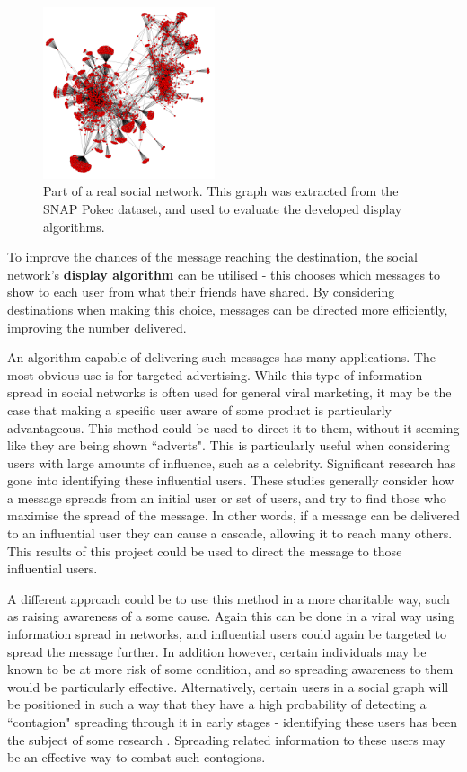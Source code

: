\documentclass[bsc,frontabs,twoside,singlespacing,parskip,deptreport]{infthesis}     %
\begin{document}
\begin{figure}
\centering
\includegraphics[width=0.45\textwidth]{pokec_4000}
\caption{Part of a real social network. This graph was extracted from the SNAP Pokec dataset\cite{snapnets}, and used to evaluate the developed display algorithms.}
\label{fig:pokec_4000_intro}
\end{figure}

To improve the chances of the message reaching the destination, the social network's \textbf{display algorithm} can be utilised - this chooses which messages to show to each user from what their friends have shared. By considering destinations when making this choice, messages can be directed more efficiently, improving the number delivered.

An algorithm capable of delivering such messages has many applications. The most obvious use is for targeted advertising. While this type of information spread in social networks is often used for general viral marketing, it may be the case that making a specific user aware of some product is particularly advantageous. This method could be used to direct it to them, without it seeming like they are being shown ``adverts". This is particularly useful when considering users with large amounts of influence, such as a celebrity. Significant research has gone into identifying these influential users\cite{InfluenceMaximisation1, InfluenceMaximisation2, LabelledInfluenceMaximisation}. These studies generally consider how a message spreads from an initial user or set of users, and try to find those who maximise the spread of the message. In other words, if a message can be delivered to an influential user they can cause a cascade, allowing it to reach many others. This results of this project could be used to direct the message to those influential users.

A different approach could be to use this method in a more charitable way, such as raising awareness of a some cause. Again this can be done in a viral way using information spread in networks, and influential users could again be targeted to spread the message further. In addition however, certain individuals may be known to be at more risk of some condition, and so spreading awareness to them would be particularly effective. Alternatively, certain users in a social graph will be positioned in such a way that they have a high probability of detecting a ``contagion" spreading through it in early stages - identifying these users has been the subject of some research \cite{OutbreakDetection}. Spreading related information to these users may be an effective way to combat such contagions.
\end{document}
